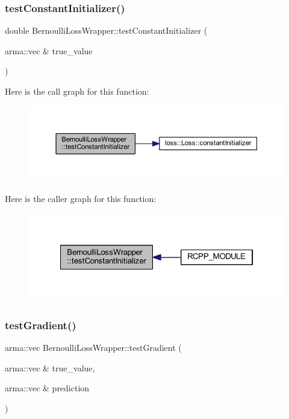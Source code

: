 \subsubsection{\texorpdfstring{test\+Constant\+Initializer()}{testConstantInitializer()}}
{\footnotesize\ttfamily double Bernoulli\+Loss\+Wrapper\+::test\+Constant\+Initializer (\begin{DoxyParamCaption}\item[{arma\+::vec \&}]{true\+\_\+value }\end{DoxyParamCaption})\hspace{0.3cm}{\ttfamily [inline]}}

Here is the call graph for this function\+:\nopagebreak
\begin{figure}[H]
\begin{center}
\leavevmode
\includegraphics[width=350pt]{class_bernoulli_loss_wrapper_adb7db2cbd85452a787ddf0c82e0e5f37_cgraph}
\end{center}
\end{figure}
Here is the caller graph for this function\+:\nopagebreak
\begin{figure}[H]
\begin{center}
\leavevmode
\includegraphics[width=322pt]{class_bernoulli_loss_wrapper_adb7db2cbd85452a787ddf0c82e0e5f37_icgraph}
\end{center}
\end{figure}
\mbox{\label{class_bernoulli_loss_wrapper_a1b38529b66b4ec5ea6028d715719c20f}} 
\subsubsection{\texorpdfstring{test\+Gradient()}{testGradient()}}
{\footnotesize\ttfamily arma\+::vec Bernoulli\+Loss\+Wrapper\+::test\+Gradient (\begin{DoxyParamCaption}\item[{arma\+::vec \&}]{true\+\_\+value,  }\item[{arma\+::vec \&}]{prediction }\end{DoxyParamCaption})\hspace{0.3cm}{\ttfamily [inline]}}

